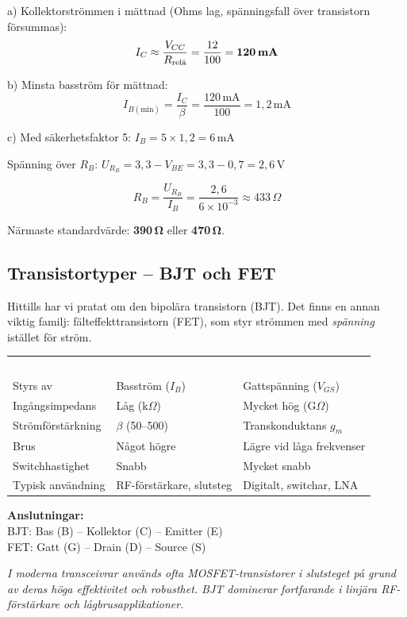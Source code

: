 \documentclass[a4paper,11pt,twoside]{book}
\newcommand{\emoji}[1]{{\emojifont #1}}
\newcommand{\tblhdr}[1]{\cellcolor{greydark}\textcolor{white}{\headingfont\bfseries\footnotesize\MakeUppercase{#1}}}
\begin{document}
\begin{worked}[title={Lösning -- Räkneexempel 1.9.5}]
a) Kollektorströmmen i mättnad (Ohms lag, spänningsfall
   över transistorn försummas):
\[ I_C \approx \frac{V_{CC}}{R_{\text{relä}}}
   = \frac{12}{100} = \textbf{120\,mA} \]

b) Minsta basström för mättnad:
\[ I_{B(\text{min})} = \frac{I_C}{\beta}
   = \frac{120\,\text{mA}}{100} = 1{,}2\,\text{mA} \]

c) Med säkerhetsfaktor 5: $I_B = 5 \times 1{,}2 = 6\,\text{mA}$

Spänning över $R_B$:
$U_{R_B} = 3{,}3 - V_{BE} = 3{,}3 - 0{,}7 = 2{,}6\,\text{V}$

\[ R_B = \frac{U_{R_B}}{I_B}
   = \frac{2{,}6}{6 \times 10^{-3}}
   \approx 433\,\Omega \]

Närmaste standardvärde: \textbf{390\,Ω} eller \textbf{470\,Ω}.
\end{worked}

\subsection{Transistortyper -- BJT och FET}

Hittills har vi pratat om den bipolära transistorn (BJT).
Det finns en annan viktig familj: fälteffekttransistorn (FET),
som styr strömmen med \emph{spänning} istället för ström.

\begin{bluebox}[title={\emoji{🔑} BJT vs FET -- en jämförelse}]
\begin{center}
\begin{tabular}{lll}
\rowcolor{greydark}
\tblhdr{Egenskap} & \tblhdr{BJT} & \tblhdr{FET (MOSFET)} \\
Styrs av & Basström ($I_B$) & Gattspänning ($V_{GS}$) \\
\rowcolor{greylight}
Ingångsimpedans & Låg (k$\Omega$) & Mycket hög (G$\Omega$) \\
Strömförstärkning & $\beta$ (50--500) & Transkonduktans $g_m$ \\
\rowcolor{greylight}
Brus & Något högre & Lägre vid låga frekvenser \\
Switchhastighet & Snabb & Mycket snabb \\
\rowcolor{greylight}
Typisk användning & RF-förstärkare, slutsteg & Digitalt, switchar, LNA \\
\end{tabular}
\end{center}

\medskip
\textbf{Anslutningar:}\\
BJT: Bas (B) -- Kollektor (C) -- Emitter (E)\\
FET: Gatt (G) -- Drain (D) -- Source (S)

\medskip
{\small\itshape I moderna transceivrar används ofta MOSFET-transistorer
i slutsteget på grund av deras höga effektivitet och robusthet.
BJT dominerar fortfarande i linjära RF-förstärkare och
lågbrusapplikationer.}
\end{bluebox}
\end{document}
